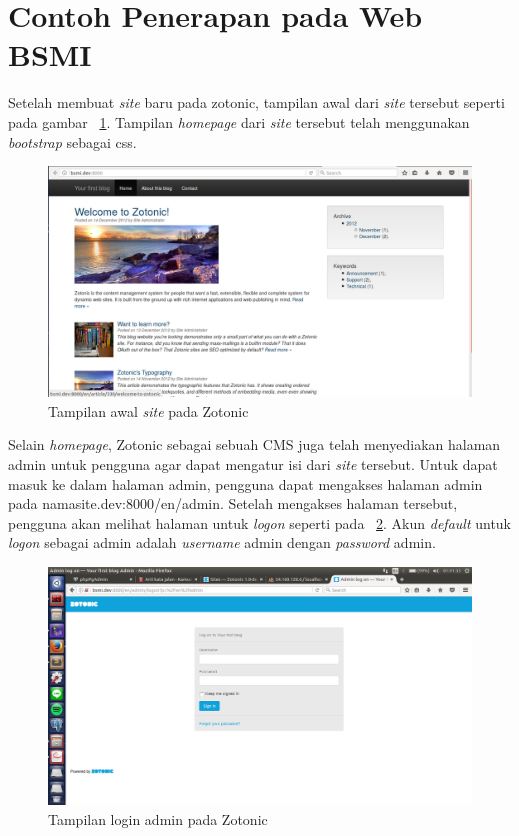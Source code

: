 \section{Contoh Penerapan pada Web BSMI}

Setelah membuat \textit{site} baru pada zotonic, tampilan awal dari \textit{site} tersebut seperti pada gambar \pic~\ref{fig:home}. Tampilan \textit{homepage} dari \textit{site} tersebut telah menggunakan \textit{bootstrap} sebagai css.
\begin{figure}
	\centering
	\includegraphics[width=1\textwidth]
	{pics/1-home.png}
	\caption{Tampilan awal \textit{site} pada Zotonic}
	\label{fig:home}
\end{figure}
\vspace{-0.3cm}

Selain \textit{homepage}, Zotonic sebagai sebuah CMS juga telah menyediakan halaman admin untuk pengguna agar dapat mengatur isi dari \textit{site} tersebut. Untuk dapat masuk ke dalam halaman admin, pengguna dapat mengakses halaman admin pada namasite.dev:8000/en/admin. Setelah mengakses halaman tersebut, pengguna akan melihat halaman untuk \textit{logon} seperti pada \pic~\ref{fig:logon}. Akun \textit{default} untuk \textit{logon} sebagai admin adalah \textit{username} admin dengan \textit{password} admin.
\begin{figure}
	\centering
	\includegraphics[width=1\textwidth]
	{pics/2-adminLogon.png}
	\caption{Tampilan login admin pada Zotonic}
	\label{fig:logon}
\end{figure}
\vspace{-0.3cm}

